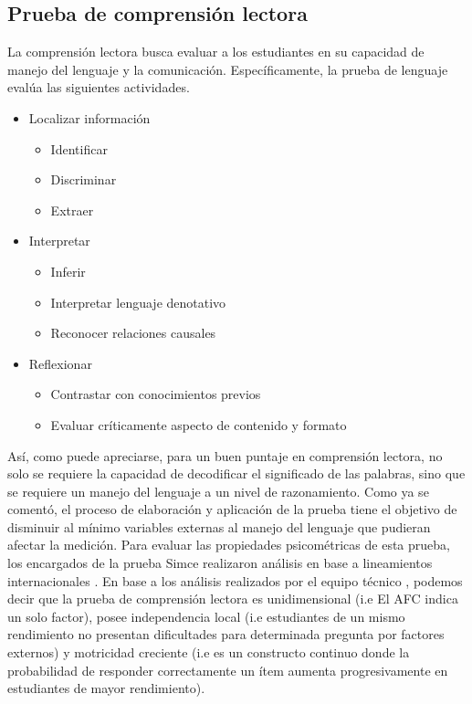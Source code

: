 \documentclass[12pt,twoside]{templates/facsothesis}
\providecommand{\tightlist}{%
  \setlength{\itemsep}{0pt}\setlength{\parskip}{0pt}}
\begin{document}
\hypertarget{prueba-de-comprensiuxf3n-lectora}{%
\subsection{Prueba de comprensión lectora}\label{prueba-de-comprensiuxf3n-lectora}}

La comprensión lectora busca evaluar a los estudiantes en su capacidad de manejo del lenguaje y la comunicación. Específicamente, la prueba de lenguaje evalúa las siguientes actividades.

\begin{itemize}
\tightlist
\item
  Localizar información

  \begin{itemize}
  \tightlist
  \item
    Identificar
  \item
    Discriminar
  \item
    Extraer
  \end{itemize}
\item
  Interpretar

  \begin{itemize}
  \tightlist
  \item
    Inferir
  \item
    Interpretar lenguaje denotativo
  \item
    Reconocer relaciones causales
  \end{itemize}
\item
  Reflexionar

  \begin{itemize}
  \tightlist
  \item
    Contrastar con conocimientos previos
  \item
    Evaluar críticamente aspecto de contenido y formato
  \end{itemize}
\end{itemize}

Así, como puede apreciarse, para un buen puntaje en comprensión lectora, no solo se requiere la capacidad de decodificar el significado de las palabras, sino que se requiere un manejo del lenguaje a un nivel de razonamiento. Como ya se comentó, el proceso de elaboración y aplicación de la prueba tiene el objetivo de disminuir al mínimo variables externas al manejo del lenguaje que pudieran afectar la medición. Para evaluar las propiedades psicométricas de esta prueba, los encargados de la prueba Simce realizaron análisis en base a lineamientos internacionales \citep{aeraReportRecommendationsReauthorization2011}. En base a los análisis realizados por el equipo técnico \citep{aceInformeTecnicoSimce2018}, podemos decir que la prueba de comprensión lectora es unidimensional (i.e El AFC indica un solo factor), posee independencia local (i.e estudiantes de un mismo rendimiento no presentan dificultades para determinada pregunta por factores externos) y motricidad creciente (i.e es un constructo continuo donde la probabilidad de responder correctamente un ítem aumenta progresivamente en estudiantes de mayor rendimiento).
\end{document}
